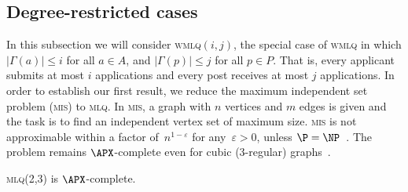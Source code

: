 \documentclass{llncs}
\begin{document}
\subsection{Degree-restricted cases}
\label{sec:degreerest}
In this subsection we will consider \textsc{wmlq}$(i,j)$, the special case of \textsc{wmlq} in which $|\Gamma(a)|\leq i$ for all $a\in A$, and $|\Gamma(p)|\leq j$ for all $p\in P$. That is, every applicant submits at most $i$ applications and every post receives at most $j$ applications. In order to establish our first result, we reduce the maximum independent set problem (\textsc{mis}) to \textsc{mlq}. In \textsc{mis}, a graph with $n$ vertices and $m$ edges is given and the task is to find an independent vertex set of maximum size. 
\textsc{mis} is not approximable within a factor of~$n^{1-\varepsilon}$ for any~$\varepsilon > 0$, unless $\P = \NP$~\cite{Zuc07}. The problem remains $\APX$-complete even for cubic (3-regular) graphs~\cite{AK00}.

\begin{theorem}
	\label{th:max_spa_np}
	\textsc{mlq(2,3)} is $\APX$-complete.
\end{theorem}
\end{document}
